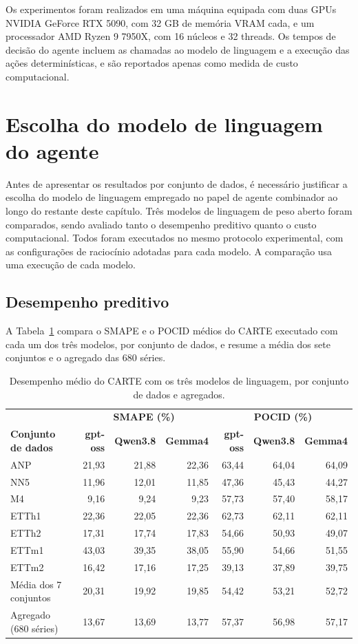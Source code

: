 Os experimentos foram realizados em uma máquina equipada com duas GPUs NVIDIA GeForce RTX 5090, com 32 GB de memória VRAM cada, e um processador AMD Ryzen 9 7950X, com 16 núcleos e 32 threads. Os tempos de decisão do agente incluem as chamadas ao modelo de linguagem e a execução das ações determinísticas, e são reportados apenas como medida de custo computacional.
\section{Escolha do modelo de linguagem do agente} \label{sec:escolha-llm}

Antes de apresentar os resultados por conjunto de dados, é necessário justificar a escolha do modelo de linguagem empregado no papel de agente combinador ao longo do restante deste capítulo. Três modelos de linguagem de peso aberto foram comparados, sendo avaliado tanto o desempenho preditivo quanto o custo computacional. Todos foram executados no mesmo protocolo experimental, com as configurações de raciocínio adotadas para cada modelo. A comparação usa uma execução de cada modelo.

\subsection{Desempenho preditivo}

A Tabela~\ref{tab:escolha-llm-desempenho} compara o SMAPE e o POCID médios do CARTE executado com cada um dos três modelos, por conjunto de dados, e resume a média dos sete conjuntos e o agregado das 680 séries.

\begin{table}[H]
\small
\centering
\caption{Desempenho médio do CARTE com os três modelos de linguagem, por conjunto de dados e agregados.}
\label{tab:escolha-llm-desempenho}
\begin{tabular}{@{}lrrrrrr@{}}
\toprule
& \multicolumn{3}{c}{\textbf{SMAPE (\%)}} & \multicolumn{3}{c}{\textbf{POCID (\%)}} \\
\textbf{Conjunto de dados} & \textbf{gpt-oss} & \textbf{Qwen3.8} & \textbf{Gemma4} & \textbf{gpt-oss} & \textbf{Qwen3.8} & \textbf{Gemma4} \\
\midrule
ANP    & 21,93 & 21,88 & 22,36 & 63,44 & 64,04 & 64,09 \\
NN5    & 11,96 & 12,01 & 11,85 & 47,36 & 45,43 & 44,27 \\
M4     & 9,16  & 9,24  & 9,23  & 57,73 & 57,40 & 58,17 \\
ETTh1  & 22,36 & 22,05 & 22,36 & 62,73 & 62,11 & 62,11 \\
ETTh2  & 17,31 & 17,74 & 17,83 & 54,66 & 50,93 & 49,07 \\
ETTm1  & 43,03 & 39,35 & 38,05 & 55,90 & 54,66 & 51,55 \\
ETTm2  & 16,42 & 17,16 & 17,25 & 39,13 & 37,89 & 39,75 \\
\midrule
Média dos 7 conjuntos & 20,31 & 19,92 & 19,85 & 54,42 & 53,21 & 52,72 \\
Agregado (680 séries) & 13,67 & 13,69 & 13,77 & 57,37 & 56,98 & 57,17 \\
\bottomrule
\end{tabular}
\end{table}

